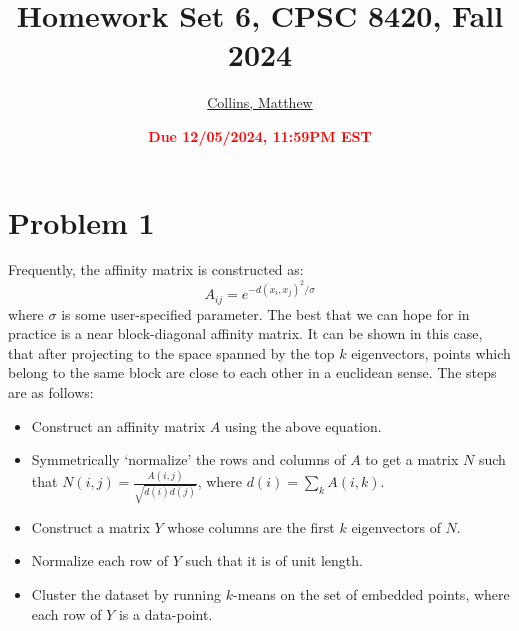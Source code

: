 \documentclass[11pt]{article}
\title{{\bf Homework Set 6, CPSC 8420, Fall 2024}} %
\author{\Large\underline{Collins, Matthew}}
\date{\textbf{\Large\textcolor{red}{Due 12/05/2024, 11:59PM EST}}} %
\begin{document}
\maketitle


\section*{Problem 1}
Frequently, the affinity matrix is constructed as:
\begin{equation}
	A_{ij}=e^{-d(x_i,x_j)^2/\sigma}
\end{equation}
where $\sigma$  is some user-specified parameter. The best that we can hope for in practice is a near block-diagonal
affinity matrix. It can be shown in this case, that after projecting to the space spanned by the top $k$
eigenvectors, points which belong to the same block are close to each other in a euclidean sense. The steps are as follows:
\begin{itemize}
	\item Construct an affinity matrix $A$ using the above equation.
	\item Symmetrically `normalize’ the rows and columns of $A$ to get a matrix $N$ such that $N(i,j)=\frac{A(i,j)}{\sqrt{d(i)d(j)}}$, where $d(i)=\sum_k A(i,k)$.
	\item Construct a matrix $Y$ whose columns are the first $k$ eigenvectors of $N$.
	\item Normalize each row of $Y$ such that it is of unit length.
	\item Cluster the dataset by running $k$-means on the set of  embedded points, where each row of $Y$ is a data-point.
\end{itemize}
\end{document}
